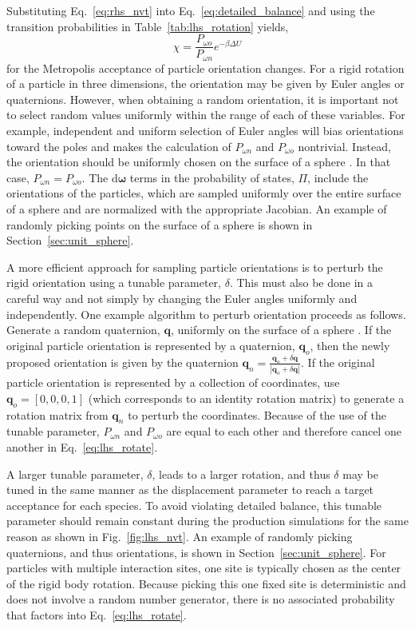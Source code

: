 \documentclass[
  9pt,
  bestpractices,
]{livecoms}
\begin{document}
Substituting Eq.~\ref{eq:rhs_nvt} into Eq.~\ref{eq:detailed_balance} and using the transition probabilities in Table~\ref{tab:lhs_rotation} yields,
\begin{equation}
\chi = \frac{P_{\omega o}}{P_{\omega n}}e^{-\beta\Delta U}
\label{eq:lhs_rotate}
\end{equation}
for the Metropolis acceptance of particle orientation changes.
For a rigid rotation of a particle in three dimensions, the orientation may be given by Euler angles or quaternions.
However, when obtaining a random orientation, it is important not to select random values uniformly within the range of each of these variables.
For example, independent and uniform selection of Euler angles will bias orientations toward the poles and makes the calculation of $P_{\omega n}$ and $P_{\omega o}$ nontrivial.
Instead, the orientation should be uniformly chosen on the surface of a sphere \cite{allen_computer_1989}.
In that case, $P_{\omega n}=P_{\omega o}$.
The d$\boldsymbol{\omega}$ terms in the probability of states, $\Pi$, include the orientations of the particles, which are sampled uniformly over the entire surface of a sphere and are normalized with the appropriate Jacobian.
An example of randomly picking points on the surface of a sphere is shown in Section~\ref{sec:unit_sphere}.

A more efficient approach for sampling particle orientations is to perturb the rigid orientation using a tunable parameter, $\delta$.
This must also be done in a careful way and not simply by changing the Euler angles uniformly and independently.
One example algorithm to perturb orientation proceeds as follows.
Generate a random quaternion, $\mathbf{q}$, uniformly on the surface of a sphere \cite{vesely_angular_1982}.
If the original particle orientation is represented by a quaternion, $\mathbf{q}_o$, then the newly proposed orientation is given by the quaternion $\mathbf{q}_n=\frac{\mathbf{q}_o+\delta\mathbf{q}}{|\mathbf{q}_o+\delta\mathbf{q}|}$.
If the original particle orientation is represented by a collection of coordinates, use $\mathbf{q}_o=[0, 0, 0, 1]$ (which corresponds to an identity rotation matrix) to generate a rotation matrix from $\mathbf{q}_n$ to perturb the coordinates.
Because of the use of the tunable parameter, $P_{\omega n}$ and $P_{\omega o}$ are equal to each other and therefore cancel one another in Eq.~\ref{eq:lhs_rotate}.

A larger tunable parameter, $\delta$, leads to a larger rotation, and thus $\delta$ may be tuned in the same manner as the displacement parameter to reach a target acceptance for each species.
To avoid violating detailed balance, this tunable parameter should remain constant during the production simulations for the same reason as shown in Fig.~\ref{fig:lhs_nvt}.
An example of randomly picking quaternions, and thus orientations, is shown in Section~\ref{sec:unit_sphere}.
For particles with multiple interaction sites, one site is typically chosen as the center of the rigid body rotation.
Because picking this one fixed site is deterministic and does not involve a random number generator, there is no associated probability that factors into Eq.~\ref{eq:lhs_rotate}.
\end{document}
